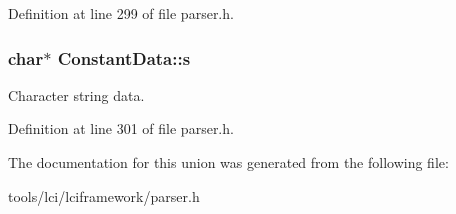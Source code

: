Definition at line 299 of file parser.\-h.

\hypertarget{union_constant_data_aee1ab22b8dd076717f5de146f8939b46}{
\subsubsection[{s}]{\setlength{\rightskip}{0pt plus 5cm}char$\ast$ {\bf Constant\-Data\-::s}}}\label{union_constant_data_aee1ab22b8dd076717f5de146f8939b46}
Character string data. 

Definition at line 301 of file parser.\-h.



The documentation for this union was generated from the following file\-:\begin{DoxyCompactItemize}
\item 
tools/lci/lciframework/parser.\-h\end{DoxyCompactItemize}
